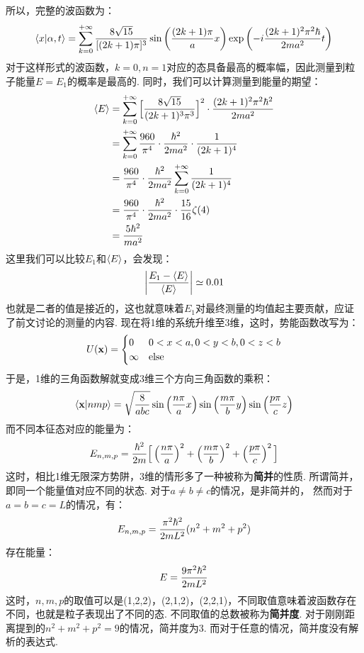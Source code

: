 所以，完整的波函数为：
\[
\bra{x}\ket{\alpha,t} = \sum_{k=0}^{+\infty}\frac{8\sqrt{15}}{[(2k+1)\pi]^{3}}\sin\left({\frac{(2k+1)\pi}{a}x}\right)\exp\left({-i\frac{(2k+1)^2\pi^2\hbar}{2ma^2}t}\right)
\]
对于这样形式的波函数，\(k=0,n=1\)对应的态具备最高的概率幅，因此测量到粒子能量\(E=E_{1}\)的概率是最高的. 同时，我们可以计算测量到能量的期望：
\begin{align*}
\left\langle{E}\right\rangle
& = \sum_{k=0}^{+\infty} \Big[\frac{8\sqrt{15}}{(2k+1)^{3}\pi^3}\Big]^{2}\cdot\frac{(2k+1)^{2}\pi^2\hbar^{2}}{2ma^2} \\
& = \sum_{k=0}^{+\infty} \frac{960}{\pi^4}\cdot\frac{\hbar^2}{2ma^2}\cdot\frac{1}{(2k+1)^4} \\
& = \frac{960}{\pi^4}\cdot\frac{\hbar^2}{2ma^2}\sum_{k=0}^{+\infty}\frac{1}{(2k+1)^4} \\
& = \frac{960}{\pi^4}\cdot\frac{\hbar^2}{2ma^2}\cdot\frac{15}{16}\zeta(4) \\
& = \frac{5\hbar^2}{ma^2}
\end{align*}
这里我们可以比较\(E_{1}\)和\(\left\langle{E}\right\rangle\)，会发现：
\[
\abs{\frac{E_{1} - \left\langle{E}\right\rangle}{\left\langle{E}\right\rangle}} \simeq 0.01
\]
也就是二者的值是接近的，这也就意味着\(E_{1}\)对最终测量的均值起主要贡献，应证了前文讨论的测量的内容. 现在将1维的系统升维至3维，这时，势能函数改写为：
\[
U(\mathbf{x})
= \begin{cases}
0 & 0<x<a,0<y<b,0<z<b \\
\infty & \mathrm{else}
\end{cases}
\]
于是，1维的三角函数解就变成3维三个方向三角函数的乘积：
\[
\bra{\mathbf{x}}\ket{nmp} = \sqrt{\frac{8}{abc}}\sin\left({\frac{n\pi}{a}x}\right)\sin\left({\frac{m\pi}{b}y}\right)\sin\left({\frac{p\pi}{c}z}\right)
\]
而不同本征态对应的能量为：
\[
E_{n,m,p} = \frac{\hbar^2}{2m}\Big[\left({\frac{n\pi}{a}}\right)^{2} + \left({\frac{m\pi}{b}}\right)^{2} + \left({\frac{p\pi}{c}}\right)^{2} \Big]
\]
这时，相比1维无限深方势阱，3维的情形多了一种被称为\textbf{简并}的性质. 所谓简并，即同一个能量值对应不同的状态. 对于\(a\neq b\neq c\)的情况，是非简并的，
然而对于\(a=b=c=L\)的情况，有：
\[
E_{n,m,p} = \frac{\pi^2\hbar^2}{2mL^{2}}(n^2 + m^2 + p^2)
\]
存在能量：
\[
E = \frac{9\pi^2\hbar^2}{2mL^{2}}
\]
这时，\(n,m,p\)的取值可以是(1,2,2)，(2,1,2)，(2,2,1)，不同取值意味着波函数存在不同，也就是粒子表现出了不同的态. 不同取值的总数被称为\textbf{简并度}. 
对于刚刚距离提到的\(n^2+m^2+p^2 = 9\)的情况，简并度为3. 而对于任意的情况，简并度没有解析的表达式. 
